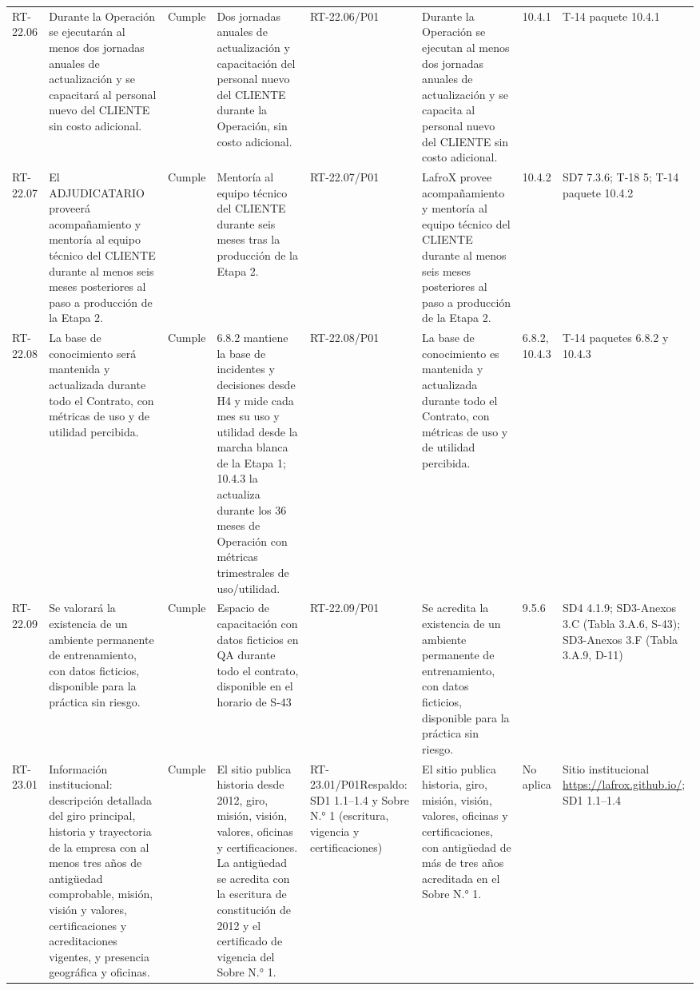 \documentclass[oficio,firma,final]{lafrox}
\begin{document}
\begin{landscape}
{\begin{longtable}{@{}F{0.054} F{0.173} F{0.061} F{0.191} F{0.106} F{0.180} F{0.067} F{0.168}@{}}
  RT-22.06 & Durante la Operación se ejecutarán al menos dos jornadas anuales de actualización y se capacitará al personal nuevo del CLIENTE sin costo adicional. & Cumple & Dos jornadas anuales de actualización y capacitación del personal nuevo del CLIENTE durante la Operación, sin costo adicional. & RT-22.06/\allowbreak{}P01 & Durante la Operación se ejecutan al menos dos jornadas anuales de actualización y se capacita al personal nuevo del CLIENTE sin costo adicional. & 10.4.1 & T-14 paquete 10.4.1  \\
  RT-22.07 & El ADJUDICATARIO proveerá acompañamiento y mentoría al equipo técnico del CLIENTE durante al menos seis meses posteriores al paso a producción de la Etapa 2. & Cumple & Mentoría al equipo técnico del CLIENTE durante seis meses tras la producción de la Etapa 2. & RT-22.07/\allowbreak{}P01 & LafroX provee acompañamiento y mentoría al equipo técnico del CLIENTE durante al menos seis meses posteriores al paso a producción de la Etapa 2. & 10.4.2 & SD7 7.3.6; T-18 5; T-14 paquete 10.4.2  \\
  RT-22.08 & La base de conocimiento será mantenida y actualizada durante todo el Contrato, con métricas de uso y de utilidad percibida. & Cumple & 6.8.2 mantiene la base de incidentes y decisiones desde H4 y mide cada mes su uso y utilidad desde la marcha blanca de la Etapa 1; 10.4.3 la actualiza durante los 36 meses de Operación con métricas trimestrales de uso/utilidad. & RT-22.08/\allowbreak{}P01 & La base de conocimiento es mantenida y actualizada durante todo el Contrato, con métricas de uso y de utilidad percibida. & 6.8.2, 10.4.3 & T-14 paquetes 6.8.2 y 10.4.3  \\
  RT-22.09 & Se valorará la existencia de un ambiente permanente de entrenamiento, con datos ficticios, disponible para la práctica sin riesgo. & Cumple & Espacio de capacitación con datos ficticios en QA durante todo el contrato, disponible en el horario de S-43 & RT-22.09/\allowbreak{}P01 & Se acredita la existencia de un ambiente permanente de entrenamiento, con datos ficticios, disponible para la práctica sin riesgo. & 9.5.6 & SD4 4.1.9; SD3-Anexos 3.C (Tabla 3.A.6, S-43); SD3-Anexos 3.F (Tabla 3.A.9, D-11)  \\
  RT-23.01 & Información institucional: descripción detallada del giro principal, historia y trayectoria de la empresa con al menos tres años de antigüedad comprobable, misión, visión y valores, certificaciones y acreditaciones vigentes, y presencia geográfica y oficinas. & Cumple & El sitio publica historia desde 2012, giro, misión, visión, valores, oficinas y certificaciones. La antigüedad se acredita con la escritura de constitución de 2012 y el certificado de vigencia del Sobre N.° 1. & RT-23.01/\allowbreak{}P01\newline Respaldo: SD1 1.1--1.4 y Sobre N.° 1 (escritura, vigencia y certificaciones) & El sitio publica historia, giro, misión, visión, valores, oficinas y certificaciones, con antigüedad de más de tres años acreditada en el Sobre N.° 1. & No aplica & Sitio institucional \url{https://lafrox.github.io/}; SD1 1.1–1.4  \\

\end{longtable}}
\end{landscape}
\end{document}
